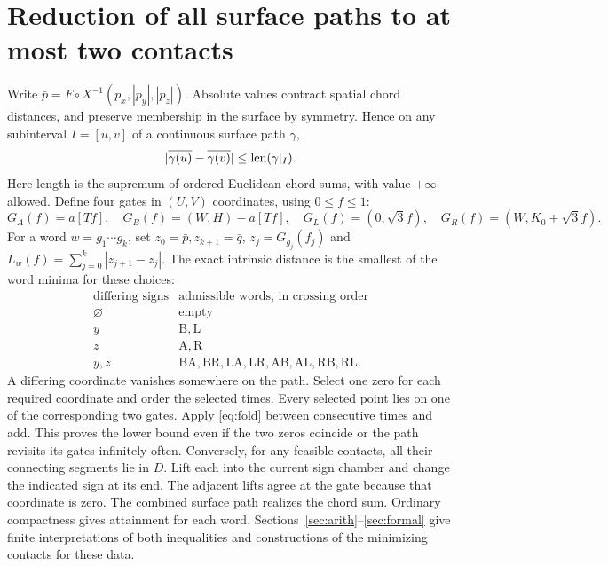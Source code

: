 \documentclass[10pt,letterpaper]{article}
\begin{document}
\section{Reduction of all surface paths to at most two contacts}\label{sec:global}
Write $\bar p=F\circ X^{-1}(p_x,|p_y|,|p_z|)$. Absolute values contract spatial chord distances, and preserve membership in the surface by symmetry. Hence on any subinterval $I=[u,v]$ of a continuous surface path $\gamma$,
\begin{equation}
    |\overline{\gamma(u)}-\overline{\gamma(v)}|
                   \le \operatorname{len}(\gamma|_I).                  \label{eq:fold}
\end{equation}
Here length is the supremum of ordered Euclidean chord sums, with value $+\infty$ allowed. Define four gates in $(U,V)$ coordinates, using $0\le f\le1$:
\[
 G_A(f)=a[Tf],\quad G_B(f)=(W,H)-a[Tf],\quad
 G_L(f)=(0,\sqrt3 f),\quad G_R(f)=(W,K_0+\sqrt3 f).
\]
For a word $w=g_1\cdots g_k$, set $z_0=\bar p,z_{k+1}=\bar q$, $z_j=G_{g_j}(f_j)$ and $L_w(f)=\sum_{j=0}^k |z_{j+1}-z_j|$. The exact intrinsic distance is the smallest of the word minima for these choices:
\[
\begin{array}{c|l}
 \text{differing signs} & \text{admissible words, in crossing order}\\ \hline
 \varnothing & \text{empty}\\
 y & \mathrm B,\mathrm L\\
 z & \mathrm A,\mathrm R\\
 y,z & \mathrm{BA,BR,LA,LR,AB,AL,RB,RL}.
\end{array}
\]
A differing coordinate vanishes somewhere on the path. Select one zero for each required coordinate and order the selected times. Every selected point lies on one of the corresponding two gates. Apply \eqref{eq:fold} between consecutive times and add. This proves the lower bound even if the two zeros coincide or the path revisits its gates infinitely often. Conversely, for any feasible contacts, all their connecting segments lie in $D$. Lift each into the current sign chamber and change the indicated sign at its end. The adjacent lifts agree at the gate because that coordinate is zero. The combined surface path realizes the chord sum. Ordinary compactness gives attainment for each word. Sections~\ref{sec:arith}--\ref{sec:formal} give finite interpretations of both inequalities and constructions of the minimizing contacts for these data.
\end{document}
